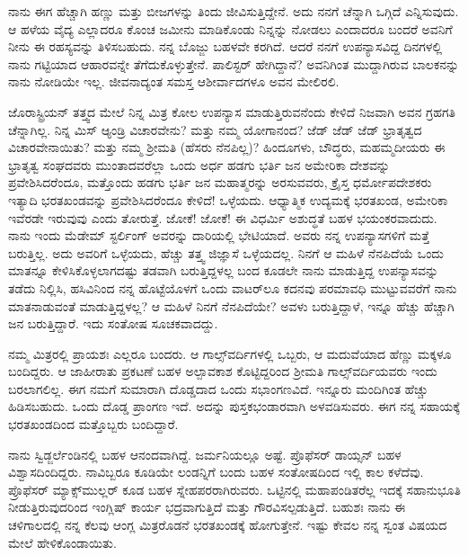 ನಾನು ಈಗ ಹೆಚ್ಚಾಗಿ ಹಣ್ಣು ಮತ್ತು ಬೀಜಗಳನ್ನು ತಿಂದು ಜೀವಿಸುತ್ತಿದ್ದೇನೆ. ಅದು ನನಗೆ ಚೆನ್ನಾಗಿ ಒಗ್ಗಿದೆ ಎನ್ನಿಸುವುದು. ಆ ಹಳೆಯ ವೈದ್ಯ ಎಲ್ಲಾದರೂ ಕೊಂಚ ಜಮೀನು ಮಾಡಿಕೊಂಡು ನಿನ್ನನ್ನು ನೋಡಲು ಎಂದಾದರೂ ಬಂದರೆ ಅವನಿಗೆ ನೀನು ಈ ರಹಸ್ಯವನ್ನು ತಿಳಿಸಬಹುದು. ನನ್ನ ಬೊಜ್ಜು ಬಹಳವೇ ಕರಗಿದೆ. ಆದರೆ ನನಗೆ ಉಪನ್ಯಾಸವಿದ್ದ ದಿನಗಳಲ್ಲಿ ನಾನು ಗಟ್ಟಿಯಾದ ಆಹಾರವನ್ನೇ ತೆಗೆದುಕೊಳ್ಳುತ್ತೇನೆ. ಪಾಲಿಸ್ಟರ್ ಹೇಗಿದ್ದಾನೆ? ಅವನಿಗಿಂತ ಮುದ್ದಾಗಿರುವ ಬಾಲಕನನ್ನು ನಾನು ನೋಡಿಯೇ ಇಲ್ಲ. ಜೀವನಾದ್ಯಂತ ಸಮಸ್ತ ಆಶೀರ್ವಾದಗಳೂ ಅವನ ಮೇಲಿರಲಿ.

ಜೊರಾಸ್ಟ್ರಿಯನ್ ತತ್ತ್ವದ ಮೇಲೆ ನಿನ್ನ ಮಿತ್ರ ಕೋಲ ಉಪನ್ಯಾಸ ಮಾಡುತ್ತಿರುವನೆಂದು ಕೇಳಿದೆ\enginline{-} ನಿಜವಾಗಿ ಅವನ ಗ್ರಹಗತಿ ಚೆನ್ನಾಗಿಲ್ಲ. ನಿನ್ನ ಮಿಸ್ ಆ್ಯಂಡ್ರಿ ವಿಚಾರವೇನು? ಮತ್ತು ನಮ್ಮ ಯೋಗಾನಂದ? ಜೆಡ್ ಜೆಡ್ ಜೆಡ್ ಭ್ರಾತೃತ್ವದ ವಿಚಾರವೇನಾಯಿತು? ಮತ್ತು ನಮ್ಮ ಶ‍್ರೀಮತಿ\enginline{-} (ಹೆಸರು ನೆನಪಿಲ್ಲ)? ಹಿಂದೂಗಳು, ಬೌದ್ಧರು, ಮಹಮ್ಮದೀಯರು ಈ ಭ್ರಾತೃತ್ವ ಸಂಘದವರು ಮುಂತಾದವರೆಲ್ಲಾ ಒಂದು ಅರ್ಧ ಹಡಗು ಭರ್ತಿ ಜನ ಅಮೇರಿಕಾ ದೇಶವನ್ನು ಪ್ರವೇಶಿಸಿದರೆಂದೂ, ಮತ್ತೊಂದು ಹಡಗು ಭರ್ತಿ ಜನ ಮಹಾತ್ಮರನ್ನು ಅರಸುವವರು, ಕ್ರೈಸ್ತ ಧರ್ಮೋಪದೇಶಕರು ಇತ್ಯಾದಿ ಭರತಖಂಡವನ್ನು ಪ್ರವೇಶಿಸಿದರೆಂದೂ ಕೇಳಿದೆ! ಒಳ್ಳೆಯದು. ಆಧ್ಯಾತ್ಮಿಕ ಉದ್ಯಮಕ್ಕೆ ಭರತಖಂಡ, ಅಮೇರಿಕಾ ಇವೆರಡೇ ಇರುವುವು ಎಂದು ತೋರುತ್ತೆ. ಜೋಕೆ! ಜೋಕೆ! ಈ ವಿಧರ್ಮಿ ಅಶುದ್ಧತೆ ಬಹಳ ಭಯಂಕರವಾದುದು. ನಾನು ಇಂದು ಮೆಡೇಮ್ ಸ್ಟರ್ಲಿಂಗ್ ಅವರನ್ನು ದಾರಿಯಲ್ಲಿ ಭೇಟಿಯಾದೆ. ಅವರು ನನ್ನ ಉಪನ್ಯಾಸಗಳಿಗೆ ಮತ್ತೆ ಬರುತ್ತಿಲ್ಲ. ಅದು ಅವರಿಗೆ ಒಳ್ಳೆಯದು, ಹೆಚ್ಚು ತತ್ತ್ವ ಜಿಜ್ಞಾಸೆ ಒಳ್ಳೆಯದಲ್ಲ. ನಿನಗೆ ಆ ಮಹಿಳೆ ನೆನಪಿದೆಯೆ\enginline{-} ಒಂದು ಮಾತನ್ನೂ ಕೇಳಿಸಿಕೊಳ್ಳಲಾಗದಷ್ಟು ತಡವಾಗಿ ಬರುತ್ತಿದ್ದಳಲ್ಲ\enginline{-} ಬಂದ ಕೂಡಲೇ ನಾನು ಮಾಡುತ್ತಿದ್ದ ಉಪನ್ಯಾಸವನ್ನು ತಡೆದು ನಿಲ್ಲಿಸಿ, ಹಸಿವಿನಿಂದ ನನ್ನ ಹೊಟ್ಟೆಯೊಳಗೆ ಒಂದು ವಾಟರ್‌ಲೂ ಕದನವು ಪರಮಾವಧಿ ಮುಟ್ಟುವವರೆಗೆ ನಾನು ಮಾತನಾಡುವಂತೆ ಮಾಡುತ್ತಿದ್ದಳಲ್ಲ? ಆ ಮಹಿಳೆ ನಿನಗೆ ನೆನಪಿದೆಯೇ? ಅವಳು ಬರುತ್ತಿದ್ದಾಳೆ, ಇನ್ನೂ ಹೆಚ್ಚು ಹೆಚ್ಚಾಗಿ ಜನ ಬರುತ್ತಿದ್ದಾರೆ. ಇದು ಸಂತೋಷ ಸೂಚಕವಾದದ್ದು.

ನಮ್ಮ ಮಿತ್ರರಲ್ಲಿ ಪ್ರಾಯಶಃ ಎಲ್ಲರೂ ಬಂದರು. ಆ ಗಾಲ್ಸ್‌ವರ್ದಿಗಳಲ್ಲಿ ಒಬ್ಬರು, ಆ ಮದುವೆಯಾದ ಹೆಣ್ಣು ಮಕ್ಕಳೂ ಬಂದಿದ್ದರು. ಆ ಜಾಹೀರಾತು ಪ್ರಕಟಣೆ ಬಹಳ ಅಲ್ಪಾವಕಾಶ ಕೊಟ್ಟಿದ್ದರಿಂದ ಶ‍್ರೀಮತಿ ಗಾಲ್ಸ್‌ವರ್ದಿಯವರು ಇಂದು ಬರಲಾಗಲಿಲ್ಲ. ಈಗ ನಮಗೆ ಸುಮಾರಾಗಿ ದೊಡ್ಡದಾದ ಒಂದು ಸಭಾಂಗಣವಿದೆ. ಇನ್ನೂರು ಮಂದಿಗಿಂತ ಹೆಚ್ಚು ಹಿಡಿಸಬಹುದು. ಒಂದು ದೊಡ್ಡ ಪ್ರಾಂಗಣ ಇದೆ. ಅದನ್ನು ಪುಸ್ತಕಭಂಡಾರವಾಗಿ ಅಳವಡಿಸುವರು. ಈಗ ನನ್ನ ಸಹಾಯಕ್ಕೆ ಭರತಖಂಡದಿಂದ ಮತ್ತೊಬ್ಬರು ಬಂದಿದ್ದಾರೆ.
\vspace{0.2cm}

ನಾನು ಸ್ವಿಡ್ಜರ್ಲೆಂಡಿನಲ್ಲಿ ಬಹಳ ಆನಂದವಾಗಿದ್ದೆ. ಜರ್ಮನಿಯಲ್ಲೂ ಅಷ್ಟೆ. ಪ್ರೊಫೆಸರ್ ಡಾಯ್ಸನ್ ಬಹಳ ವಿಶ್ವಾಸದಿಂದಿದ್ದರು. ನಾವಿಬ್ಬರೂ ಕೂಡಿಯೇ ಲಂಡನ್ನಿಗೆ ಬಂದು ಬಹಳ ಸಂತೋಷದಿಂದ ಇಲ್ಲಿ ಕಾಲ ಕಳೆದೆವು. ಪ್ರೊಫೆಸರ್ ಮ್ಯಾಕ್ಸ್‌ಮುಲ್ಲರ್ ಕೂಡ ಬಹಳ ಸ್ನೇಹಪರರಾಗಿರುವರು. ಒಟ್ಟಿನಲ್ಲಿ ಮಹಾಪಂಡಿತರೆಲ್ಲ ಇದಕ್ಕೆ ಸಹಾನುಭೂತಿ ನೀಡುತ್ತಿರುವುದರಿಂದ ಇಂಗ್ಲಿಷ್ ಕಾರ್ಯ ಭದ್ರವಾಗುತ್ತಿದೆ ಮತ್ತು ಗೌರವಿಸಲ್ಪಡುತ್ತಿದೆ. ಬಹುಶಃ ನಾನು ಈ ಚಳಿಗಾಲದಲ್ಲಿ ನನ್ನ ಕೆಲವು ಆಂಗ್ಲ ಮಿತ್ರರೊಡನೆ ಭರತಖಂಡಕ್ಕೆ ಹೋಗುತ್ತೇನೆ. ಇಷ್ಟು ಕೇವಲ ನನ್ನ ಸ್ವಂತ ವಿಷಯದ ಮೇಲೆ ಹೇಳಿಕೊಂಡಾಯಿತು.
\vspace{0.2cm}

